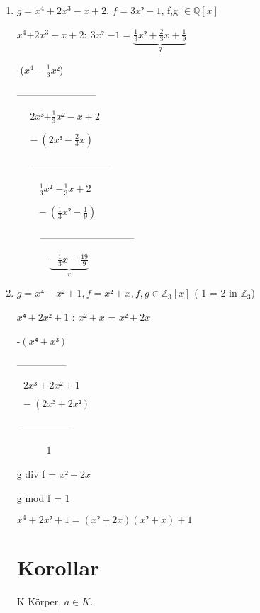 \documentclass[a4paper, openany]{book}
\begin{document}
    \begin{enumerate}[label=(\alph*)]
      \item $g = x^4 + 2x^3 - x + 2$, $f = 3x² - 1$, f,g $\in \mathbb{Q}[x]$

      \underline{$x^4$}$ + 2x^3 - x + 2 : \  $\underline{$3x²$} $-1 = \underbrace{\frac{1}{3}x² + \frac{2}{3}x + \frac{1}{9}}_{q}$


      -($x^4 - \frac{1}{3}x²$)

      ------------------------

      $\ \ \ \ \ \ $\underline{$2x³$}$ + \frac{1}{3}x² - x + 2$

      $\ \ \ \ \ - (2x³ - \frac{2}{3}x)$

      $\ \ \ \ \ $ ------------------------

      $\ \ \ \ \ \ \ \ \ \ $\underline{$\frac{1}{3}x²$} $ - \frac{1}{3}x +2$

      $\ \ \ \ \ \ \ \ \ - (\frac{1}{3}x² - \frac{1}{9})$

      $\ \ \ \ \ \ \ \ \ $ -----------------------------

      $\ \ \ \ \ \ \ \ \ \ \ \ \ \ \ \underbrace{- \frac{1}{3}x + \frac{19}{9}}_{r}$

      \item $g = x⁴ - x² + 1, f = x² + x, f,g \in \mathbb{Z}_3[x]$ (-1 = 2 in $\mathbb{Z}_3$)

      $x⁴ + 2x² + 1$ : $x² + x$ = $x²+2x$

      -$(x⁴ + x³)$

      ---------------

      $\ \ \ 2x³ + 2x² + 1$

      $\ \ - (2x³ + 2x²)$

      $\ \ $---------------

      $\ \ \ \ \ \ \ \ \ \ \ \ $ 1

      g div f = $x² + 2x$

      g mod f = 1

      \par \medskip

      $x^4 + 2x² + 1 = (x² + 2x) (x² + x) + 1$

      \section{Korollar}

      K Körper, $a \in K$.


\end{enumerate}
\end{document}
